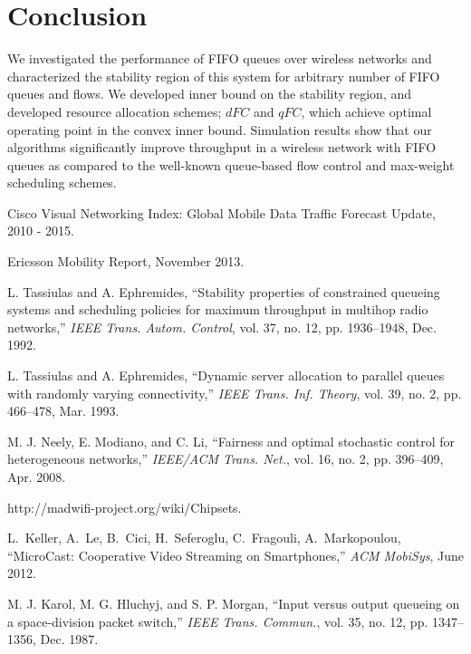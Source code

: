 \documentclass[conference]{IEEEtran}
\begin{document}
\section{Conclusion}\label{sec:conclusion}
We investigated the performance of FIFO queues over wireless networks and characterized the stability region of this system for arbitrary number of FIFO queues and flows. We developed inner bound on the stability region, and developed resource allocation schemes; $dFC$ and $qFC$, which achieve optimal operating point in the convex inner bound. Simulation results show that our algorithms significantly improve throughput in a wireless network with FIFO queues as compared to the well-known queue-based flow control and max-weight scheduling schemes.



\begin{thebibliography}{}

 Cisco Visual Networking Index: Global Mobile Data Traffic Forecast Update, 2010 - 2015.

 Ericsson Mobility Report, November 2013.

 L. Tassiulas and A. Ephremides, ``Stability properties of constrained queueing systems and scheduling policies for maximum throughput in multihop radio networks,'' {\em IEEE Trans. Autom. Control}, vol. 37, no. 12, pp. 1936--1948, Dec. 1992.

 L. Tassiulas and A. Ephremides, ``Dynamic server allocation to parallel queues with randomly varying connectivity,'' {\em IEEE Trans. Inf. Theory}, vol. 39, no. 2, pp. 466--478, Mar. 1993.

 M. J. Neely, E. Modiano, and C. Li, ``Fairness and optimal stochastic control for heterogeneous networks,'' {\em IEEE/ACM Trans. Net.}, vol. 16, no. 2, pp. 396--409, Apr. 2008.

 http://madwifi-project.org/wiki/Chipsets. 

 L.~Keller, A.~Le, B.~Cici, H.~Seferoglu, C.~Fragouli, A.~Markopoulou, ``MicroCast: Cooperative Video Streaming on Smartphones,'' {\em ACM MobiSys}, June 2012.



 M. J. Karol, M. G. Hluchyj, and S. P. Morgan, ``Input versus output queueing on a space-division packet switch,'' {\em IEEE Trans. Commun.}, vol. 35, no. 12, pp. 1347--1356, Dec. 1987.


\end{thebibliography}
\end{document}
